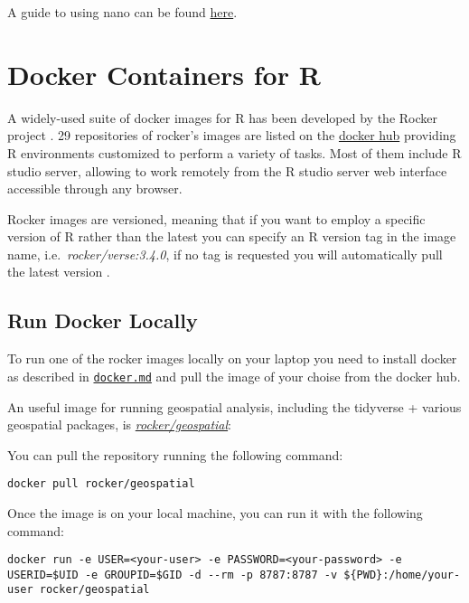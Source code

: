 \documentclass[
]{book}
\begin{document}
A guide to using nano can be found \href{https://www.howtogeek.com/howto/42980/the-beginners-guide-to-nano-the-linux-command-line-text-editor/}{here}.

\hypertarget{docker-containers-for-r}{%
\chapter{Docker Containers for R}\label{docker-containers-for-r}}

A widely-used suite of docker images for R has been developed by the Rocker project \citep{RJ-2017-065}. 29 repositories of rocker's images are listed on the \href{https://hub.docker.com/u/rocker/}{docker hub} providing R environments customized to perform a variety of tasks. Most of them include R studio server, allowing to work remotely from the R studio server web interface accessible through any browser.

Rocker images are versioned, meaning that if you want to employ a specific version of R rather than the latest you can specify an R version tag in the image name, i.e.~\emph{rocker/verse:3.4.0}, if no tag is requested you will automatically pull the latest version \citep{RJ-2017-065}.

\hypertarget{run-docker-locally}{%
\section{Run Docker Locally}\label{run-docker-locally}}

To run one of the rocker images locally on your laptop you need to install docker as described in \href{06_docker.md}{\texttt{docker.md}} and pull the image of your choise from the docker hub.

An useful image for running geospatial analysis, including the tidyverse + various geospatial packages, is \href{https://hub.docker.com/r/rocker/geospatial}{\emph{rocker/geospatial}}:

You can pull the repository running the following command:

\begin{verbatim}
docker pull rocker/geospatial
\end{verbatim}

Once the image is on your local machine, you can run it with the following command:

\begin{verbatim}
docker run -e USER=<your-user> -e PASSWORD=<your-password> -e USERID=$UID -e GROUPID=$GID -d --rm -p 8787:8787 -v ${PWD}:/home/your-user rocker/geospatial
\end{verbatim}
\end{document}
